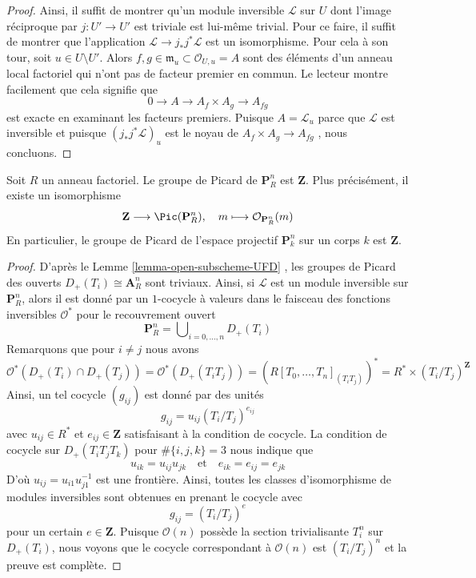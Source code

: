 \begin{proof}
\medskip\noindent
Ainsi, il suffit de montrer qu'un module inversible  $\mathcal{L}$  sur  $U$ 
dont l'image réciproque par  $j : U' \to U'$  est triviale est lui-même trivial. Pour ce faire, il
suffit de montrer que l'application  $\mathcal{L} \to j_*j^*\mathcal{L}$  est un isomorphisme. Pour cela à
son tour, soit  $u \in U \setminus U'$. Alors  $f, g \in \mathfrak m_u \subset \mathcal{O}_{U, u} = A$  sont des éléments d'un anneau local factoriel
qui n'ont pas de facteur premier en commun. Le lecteur montre facilement que cela
signifie que
$$
0 \to A \to A_f \times A_g \to A_{fg}
$$
est exacte en examinant les facteurs premiers. Puisque  $A = \mathcal{L}_u$  parce que
 $\mathcal{L}$  est inversible et puisque  $(j_*j^*\mathcal{L})_u$  est le noyau de  $A_f \times A_g \to A_{fg}$ ,
nous concluons.
\end{proof}

\begin{lemma}
\label{lemma-Pic-projective-space-UFD}
Soit  $R$  un anneau factoriel. Le groupe de Picard de  $\mathbf{P}^n_R$  est  $\mathbf{Z}$.
Plus précisément, il existe un isomorphisme
$$
\mathbf{Z} \longrightarrow \Pic(\mathbf{P}^n_R),\quad
m \longmapsto \mathcal{O}_{\mathbf{P}^n_R}(m)
$$
En particulier, le groupe de Picard de l'espace projectif  $\mathbf{P}^n_k$  sur un
corps  $k$  est  $\mathbf{Z}$.
\end{lemma}

\begin{proof}
D'après le Lemme  \ref{lemma-open-subscheme-UFD} , les groupes de Picard des ouverts  $D_+(T_i) \cong \mathbf{A}^n_R$  sont
triviaux. Ainsi, si  $\mathcal{L}$  est un module inversible sur  $\mathbf{P}^n_R$, alors
il est donné par un  $1$-cocycle à valeurs dans le faisceau des fonctions
inversibles  $\mathcal{O}^*$  pour le recouvrement ouvert
$$
\mathbf{P}^n_R = \bigcup\nolimits_{i = 0, \ldots, n} D_+(T_i)
$$
Remarquons que pour  $i \not = j$  nous avons
$$
\mathcal{O}^*(D_+(T_i) \cap D_+(T_j)) =
\mathcal{O}^*(D_+(T_iT_j)) = \left(R[T_0, \ldots, T_n]_{(T_iT_j)}\right)^* =
R^* \times (T_i/T_j)^\mathbf{Z}
$$
Ainsi, un tel cocycle  $(g_{ij})$  est donné par des unités
$$
g_{ij} = u_{ij} (T_i/T_j)^{e_{ij}}
$$
avec  $u_{ij} \in R^*$  et  $e_{ij} \in \mathbf{Z}$  satisfaisant à la condition de cocycle. La
condition de cocycle sur  $D_+(T_iT_jT_k)$  pour  $\#\{i, j, k\} = 3$  nous indique que
$$
u_{ik} = u_{ij} u_{jk} \quad\text{et}\quad
e_{ik} = e_{ij} = e_{jk}
$$
D'où  $u_{ij} = u_{i1} u_{j1}^{-1}$  est une frontière. Ainsi, toutes les classes d'isomorphisme de
modules inversibles sont obtenues en prenant le cocycle avec
$$
g_{ij} = (T_i/T_j)^e
$$
pour un certain  $e \in \mathbf{Z}$. Puisque  $\mathcal{O}(n)$  possède la section
trivialisante  $T_i^n$  sur  $D_+(T_i)$, nous voyons que le cocycle
correspondant à  $\mathcal{O}(n)$  est  $(T_i/T_j)^n$  et la preuve est complète.
\end{proof}






